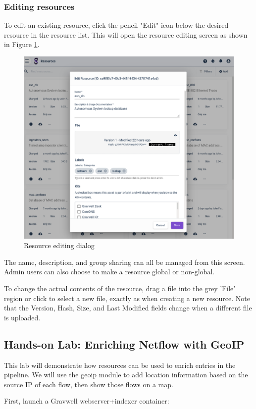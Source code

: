 \subsubsection{Editing resources}

To edit an existing resource, click the pencil "Edit" icon below the
desired resource in the resource list. This will open the resource
editing screen as shown in Figure \ref{fig:resource-edit}.

\begin{figure}
	\includegraphics[width=0.7\linewidth]{images/resource-edit.png}
	\caption{Resource editing dialog}
	\label{fig:resource-edit}
\end{figure}

The name, description, and group sharing can all be managed from this
screen. Admin users can also choose to make a resource global or
non-global.

To change the actual contents of the resource, drag a file into the
grey 'File' region or click to select a new file, exactly as when
creating a new resource. Note that the Version, Hash, Size, and Last
Modified fields change when a different file is uploaded.

\subsection{Hands-on Lab: Enriching Netflow with GeoIP}

This lab will demonstrate how resources can be used to enrich entries
in the pipeline. We will use the geoip module to add location
information based on the source IP of each flow, then show those flows
on a map.

First, launch a Gravwell webserver+indexer container:

